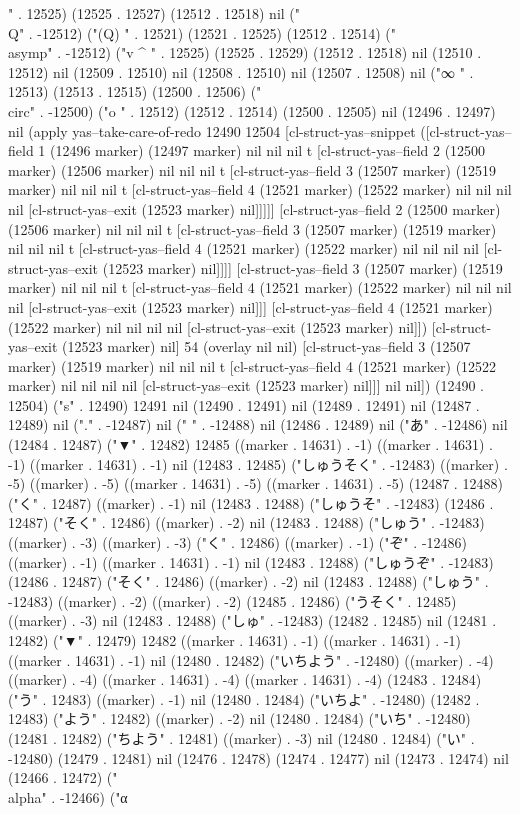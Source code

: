 " . 12525) (12525 . 12527) (12512 . 12518) nil ("\\Q" . -12512) ("(Q)
" . 12521) (12521 . 12525) (12512 . 12514) ("\\asymp" . -12512) ("v
^
" . 12525) (12525 . 12529) (12512 . 12518) nil (12510 . 12512) nil (12509 . 12510) nil (12508 . 12510) nil (12507 . 12508) nil ("∞
" . 12513) (12513 . 12515) (12500 . 12506) ("\\circ" . -12500) ("o
" . 12512) (12512 . 12514) (12500 . 12505) nil (12496 . 12497) nil (apply yas--take-care-of-redo 12490 12504 [cl-struct-yas--snippet ([cl-struct-yas--field 1 (12496 marker) (12497 marker) nil nil nil t [cl-struct-yas--field 2 (12500 marker) (12506 marker) nil nil nil t [cl-struct-yas--field 3 (12507 marker) (12519 marker) nil nil nil t [cl-struct-yas--field 4 (12521 marker) (12522 marker) nil nil nil nil [cl-struct-yas--exit (12523 marker) nil]]]]] [cl-struct-yas--field 2 (12500 marker) (12506 marker) nil nil nil t [cl-struct-yas--field 3 (12507 marker) (12519 marker) nil nil nil t [cl-struct-yas--field 4 (12521 marker) (12522 marker) nil nil nil nil [cl-struct-yas--exit (12523 marker) nil]]]] [cl-struct-yas--field 3 (12507 marker) (12519 marker) nil nil nil t [cl-struct-yas--field 4 (12521 marker) (12522 marker) nil nil nil nil [cl-struct-yas--exit (12523 marker) nil]]] [cl-struct-yas--field 4 (12521 marker) (12522 marker) nil nil nil nil [cl-struct-yas--exit (12523 marker) nil]]) [cl-struct-yas--exit (12523 marker) nil] 54 (overlay nil nil) [cl-struct-yas--field 3 (12507 marker) (12519 marker) nil nil nil t [cl-struct-yas--field 4 (12521 marker) (12522 marker) nil nil nil nil [cl-struct-yas--exit (12523 marker) nil]]] nil nil]) (12490 . 12504) ("s" . 12490) 12491 nil (12490 . 12491) nil (12489 . 12491) nil (12487 . 12489) nil ("." . -12487) nil (" " . -12488) nil (12486 . 12489) nil ("あ" . -12486) nil (12484 . 12487) ("▼" . 12482) 12485 ((marker . 14631) . -1) ((marker . 14631) . -1) ((marker . 14631) . -1) nil (12483 . 12485) ("しゅうそく" . -12483) ((marker) . -5) ((marker) . -5) ((marker . 14631) . -5) ((marker . 14631) . -5) (12487 . 12488) ("く" . 12487) ((marker) . -1) nil (12483 . 12488) ("しゅうそ" . -12483) (12486 . 12487) ("そく" . 12486) ((marker) . -2) nil (12483 . 12488) ("しゅう" . -12483) ((marker) . -3) ((marker) . -3) ("く" . 12486) ((marker) . -1) ("ぞ" . -12486) ((marker) . -1) ((marker . 14631) . -1) nil (12483 . 12488) ("しゅうぞ" . -12483) (12486 . 12487) ("そく" . 12486) ((marker) . -2) nil (12483 . 12488) ("しゅう" . -12483) ((marker) . -2) ((marker) . -2) (12485 . 12486) ("うそく" . 12485) ((marker) . -3) nil (12483 . 12488) ("しゅ" . -12483) (12482 . 12485) nil (12481 . 12482) ("▼" . 12479) 12482 ((marker . 14631) . -1) ((marker . 14631) . -1) ((marker . 14631) . -1) nil (12480 . 12482) ("いちよう" . -12480) ((marker) . -4) ((marker) . -4) ((marker . 14631) . -4) ((marker . 14631) . -4) (12483 . 12484) ("う" . 12483) ((marker) . -1) nil (12480 . 12484) ("いちよ" . -12480) (12482 . 12483) ("よう" . 12482) ((marker) . -2) nil (12480 . 12484) ("いち" . -12480) (12481 . 12482) ("ちよう" . 12481) ((marker) . -3) nil (12480 . 12484) ("い" . -12480) (12479 . 12481) nil (12476 . 12478) (12474 . 12477) nil (12473 . 12474) nil (12466 . 12472) ("\\alpha" . -12466) ("α

